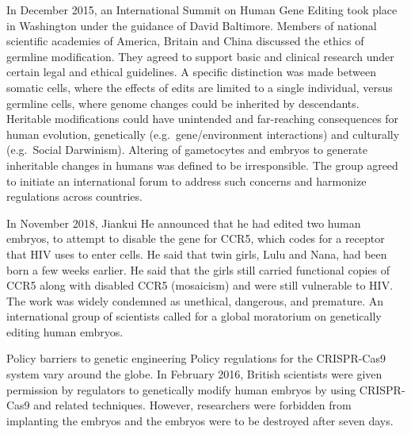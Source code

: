 In December 2015, an International Summit on Human Gene Editing took place in Washington under the guidance of David Baltimore. Members of national scientific academies of America, Britain and China discussed the ethics of germline modification. They agreed to support basic and clinical research under certain legal and ethical guidelines. A specific distinction was made between somatic cells, where the effects of edits are limited to a single individual, versus germline cells, where genome changes could be inherited by descendants. Heritable modifications could have unintended and far-reaching consequences for human evolution, genetically (e.g.~gene/environment interactions) and culturally (e.g.~Social Darwinism). Altering of gametocytes and embryos to generate inheritable changes in humans was defined to be irresponsible. The group agreed to initiate an international forum to address such concerns and harmonize regulations across countries.

In November 2018, Jiankui He announced that he had edited two human embryos, to attempt to disable the gene for CCR5, which codes for a receptor that HIV uses to enter cells. He said that twin girls, Lulu and Nana, had been born a few weeks earlier. He said that the girls still carried functional copies of CCR5 along with disabled CCR5 (mosaicism) and were still vulnerable to HIV. The work was widely condemned as unethical, dangerous, and premature. An international group of scientists called for a global moratorium on genetically editing human embryos.

Policy barriers to genetic engineering
Policy regulations for the CRISPR-Cas9 system vary around the globe. In February 2016, British scientists were given permission by regulators to genetically modify human embryos by using CRISPR-Cas9 and related techniques. However, researchers were forbidden from implanting the embryos and the embryos were to be destroyed after seven days.


